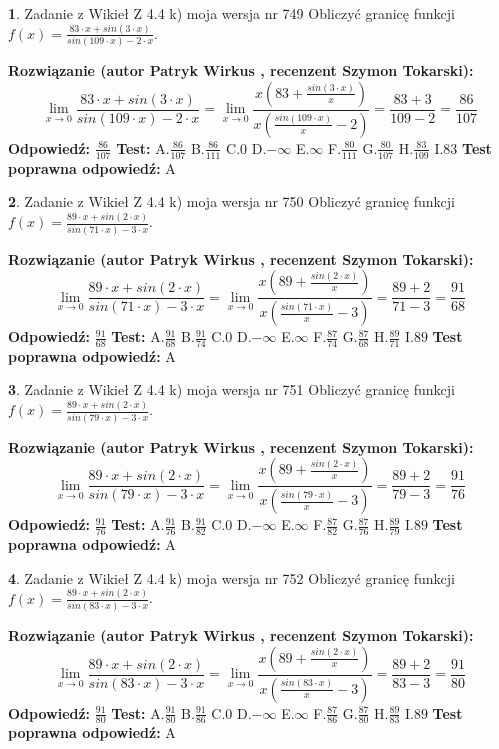 \documentclass[12pt, a4paper]{article}
\theoremstyle{definition} %
\newtheorem{zad}{}
\newcommand{\zadStart}[1]{\begin{zad}#1\newline}
\newcommand{\zadStop}{\end{zad}}
\newcommand{\rozwStart}[2]{\noindent \textbf{Rozwiązanie (autor #1 , recenzent #2): }\newline}
\newcommand{\rozwStop}{\newline}
\newcommand{\odpStart}{\noindent \textbf{Odpowiedź:}\newline}
\newcommand{\odpStop}{\newline}
\newcommand{\testStart}{\noindent \textbf{Test:}\newline}
\newcommand{\testStop}{\newline}
\newcommand{\kluczStart}{\noindent \textbf{Test poprawna odpowiedź:}\newline}
\newcommand{\kluczStop}{\newline}
\begin{document}
\zadStart{Zadanie z Wikieł Z 4.4 k) moja wersja nr 749}
Obliczyć granicę funkcji $f(x)=\frac{83\cdot x +sin(3\cdot x)}{sin(109\cdot x) -2\cdot x}$.
\zadStop
\rozwStart{Patryk Wirkus}{Szymon Tokarski}
$$\lim\limits_{x\to 0}\frac{83\cdot x +sin(3\cdot x)}{sin(109\cdot x) -2\cdot x}
=\lim\limits_{x\to 0}\frac{x(83+\frac{sin(3\cdot x)}{x})}{x(\frac{sin(109\cdot x)}{x}-2)}
=\frac{83+3}{109-2} = \frac{86}{107}$$
\rozwStop
\odpStart
$\frac{86}{107}$
\odpStop
\testStart
A.$\frac{86}{107}$
B.$\frac{86}{111}$
C.$0$
D.$-\infty$
E.$\infty$
F.$\frac{80}{111}$
G.$\frac{80}{107}$
H.$\frac{83}{109}$
I.$83$
\testStop
\kluczStart
A
\kluczStop



\zadStart{Zadanie z Wikieł Z 4.4 k) moja wersja nr 750}
Obliczyć granicę funkcji $f(x)=\frac{89\cdot x +sin(2\cdot x)}{sin(71\cdot x) -3\cdot x}$.
\zadStop
\rozwStart{Patryk Wirkus}{Szymon Tokarski}
$$\lim\limits_{x\to 0}\frac{89\cdot x +sin(2\cdot x)}{sin(71\cdot x) -3\cdot x}
=\lim\limits_{x\to 0}\frac{x(89+\frac{sin(2\cdot x)}{x})}{x(\frac{sin(71\cdot x)}{x}-3)}
=\frac{89+2}{71-3} = \frac{91}{68}$$
\rozwStop
\odpStart
$\frac{91}{68}$
\odpStop
\testStart
A.$\frac{91}{68}$
B.$\frac{91}{74}$
C.$0$
D.$-\infty$
E.$\infty$
F.$\frac{87}{74}$
G.$\frac{87}{68}$
H.$\frac{89}{71}$
I.$89$
\testStop
\kluczStart
A
\kluczStop



\zadStart{Zadanie z Wikieł Z 4.4 k) moja wersja nr 751}
Obliczyć granicę funkcji $f(x)=\frac{89\cdot x +sin(2\cdot x)}{sin(79\cdot x) -3\cdot x}$.
\zadStop
\rozwStart{Patryk Wirkus}{Szymon Tokarski}
$$\lim\limits_{x\to 0}\frac{89\cdot x +sin(2\cdot x)}{sin(79\cdot x) -3\cdot x}
=\lim\limits_{x\to 0}\frac{x(89+\frac{sin(2\cdot x)}{x})}{x(\frac{sin(79\cdot x)}{x}-3)}
=\frac{89+2}{79-3} = \frac{91}{76}$$
\rozwStop
\odpStart
$\frac{91}{76}$
\odpStop
\testStart
A.$\frac{91}{76}$
B.$\frac{91}{82}$
C.$0$
D.$-\infty$
E.$\infty$
F.$\frac{87}{82}$
G.$\frac{87}{76}$
H.$\frac{89}{79}$
I.$89$
\testStop
\kluczStart
A
\kluczStop



\zadStart{Zadanie z Wikieł Z 4.4 k) moja wersja nr 752}
Obliczyć granicę funkcji $f(x)=\frac{89\cdot x +sin(2\cdot x)}{sin(83\cdot x) -3\cdot x}$.
\zadStop
\rozwStart{Patryk Wirkus}{Szymon Tokarski}
$$\lim\limits_{x\to 0}\frac{89\cdot x +sin(2\cdot x)}{sin(83\cdot x) -3\cdot x}
=\lim\limits_{x\to 0}\frac{x(89+\frac{sin(2\cdot x)}{x})}{x(\frac{sin(83\cdot x)}{x}-3)}
=\frac{89+2}{83-3} = \frac{91}{80}$$
\rozwStop
\odpStart
$\frac{91}{80}$
\odpStop
\testStart
A.$\frac{91}{80}$
B.$\frac{91}{86}$
C.$0$
D.$-\infty$
E.$\infty$
F.$\frac{87}{86}$
G.$\frac{87}{80}$
H.$\frac{89}{83}$
I.$89$
\testStop
\kluczStart
A
\kluczStop
\end{document}
